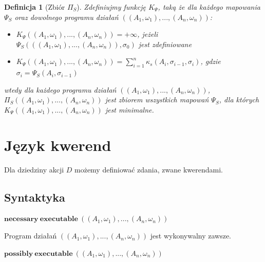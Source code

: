 \documentclass[11pt,a4paper]{article}
\newtheorem{definition}{Definicja}[section]
\begin{document}
    \begin{definition}[Zbiór $\Pi_S$]
    	Zdefiniujmy funkcję $K_{\Psi}$, taką że dla każdego mapowania $\Psi_S$ oraz dowolnego programu działań $((A_1, \omega_1),...,(A_n,\omega_n))$:
    	\begin{itemize}
    		\item $K_{\Psi}((A_1, \omega_1),...,(A_n,\omega_n)) = + \infty$, jeżeli $\Psi_S(((A_1, \omega_1),...,(A_n,\omega_n)), \sigma_0)$ jest zdefiniowane
    		\item $K_{\Psi}((A_1, \omega_1),...,(A_n,\omega_n)) = \sum_{i=1}^{n} \kappa_s(A_i, \sigma_{i-1}, \sigma_i)$, gdzie $\sigma_i = \Psi_S(A_i, \sigma_{i-1})$
    	\end{itemize}
    	
    	wtedy dla każdego programu działań $((A_1, \omega_1),...,(A_n,\omega_n))$, $\Pi_S((A_1, \omega_1),...,(A_n,\omega_n))$ jest zbiorem wszystkich mapowań $\Psi_S$, dla których $K_{\Psi}((A_1, \omega_1),...,(A_n,\omega_n))$ jest minimalne.
    \end{definition}
    
    \section{Język kwerend}
    
	Dla dziedziny akcji $D$ możemy definiować zdania, zwane kwerendami.  
    
    \subsection{Syntaktyka}
    
    
    \begin{center}
        $\mathbf{necessary}~\mathbf{executable}~((A_1, \omega_1),...,(A_n,\omega_n))$
    \end{center}
    
    Program działań $((A_1, \omega_1),...,(A_n,\omega_n))$ jest wykonywalny zawsze.
    
    \begin{center}
        $\mathbf{possibly}~\mathbf{executable}~((A_1, \omega_1),...,(A_n,\omega_n))$
    \end{center}
    
\end{document}
